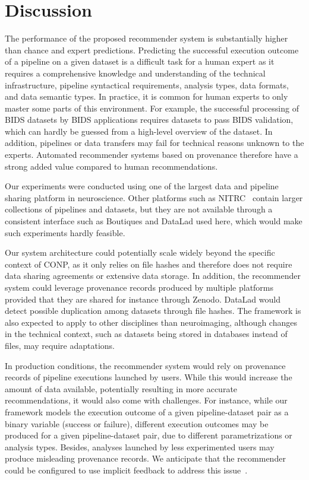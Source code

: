 \documentclass[conference]{IEEEtran}
\begin{document}
\section{Discussion}

The performance of the proposed recommender system is substantially higher
than chance and expert predictions. Predicting the successful execution
outcome of a pipeline on a given dataset is a difficult task for a human
expert as it requires a comprehensive knowledge and understanding of the
technical infrastructure, pipeline syntactical requirements, analysis
types, data formats, and data semantic types. In practice, it is common for
human experts to only master some parts of this environment. For example,
the successful processing of BIDS datasets by BIDS applications requires
datasets to pass BIDS validation, which can hardly be guessed from a
high-level overview of the dataset. In addition, pipelines or data
transfers may fail for technical reasons unknown to the experts. Automated
recommender systems based on provenance therefore have a strong added value
compared to human recommendations. 

Our experiments were conducted using one of the largest data and pipeline
sharing platform in neuroscience. Other platforms such as
NITRC~\cite{kennedy2016nitrc} contain larger collections of
pipelines and datasets, but they are not available through a consistent
interface such as Boutiques and DataLad used here, which would make
such experiments hardly feasible.

Our system architecture could potentially scale widely beyond the specific
context of CONP, as it only relies on file hashes and therefore does not
require data sharing agreements or extensive data storage. In addition, the
recommender system could leverage provenance records produced by multiple
platforms provided that they are shared for instance through Zenodo.
DataLad would detect possible duplication among datasets through file hashes. 
The framework is also expected to apply to other disciplines than neuroimaging, 
although changes in the technical context, such as datasets being stored in 
databases instead of files, may require adaptations.

In production conditions, the recommender system would rely on provenance
records of pipeline executions launched by users. While this would increase
the amount of data available, potentially resulting in more accurate
recommendations, it would also come with challenges. For instance, while
our framework models the execution outcome of a given pipeline-dataset pair
as a binary variable (success or failure), different execution outcomes may
be produced for a given pipeline-dataset pair, due to different
parametrizations or analysis types. Besides, analyses launched by less
experimented users may produce misleading provenance records. We anticipate
that the recommender could be configured to use implicit feedback to address 
this issue~\cite{hu2008collaborative}.
\end{document}
